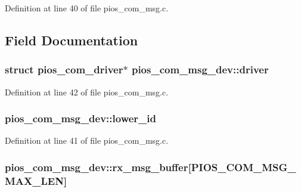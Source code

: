 Definition at line 40 of file pios\-\_\-com\-\_\-msg.\-c.



\subsection{Field Documentation}
\hypertarget{structpios__com__msg__dev_a776368775bf0a23a210d33ce79a0f620}{
\subsubsection[{driver}]{\setlength{\rightskip}{0pt plus 5cm}struct {\bf pios\-\_\-com\-\_\-driver}$\ast$ pios\-\_\-com\-\_\-msg\-\_\-dev\-::driver}}\label{structpios__com__msg__dev_a776368775bf0a23a210d33ce79a0f620}


Definition at line 42 of file pios\-\_\-com\-\_\-msg.\-c.

\hypertarget{structpios__com__msg__dev_a08cc90d0b7c8cd94cd589c948234869b}{
\subsubsection[{lower\-\_\-id}]{ pios\-\_\-com\-\_\-msg\-\_\-dev\-::lower\-\_\-id}}\label{structpios__com__msg__dev_a08cc90d0b7c8cd94cd589c948234869b}


Definition at line 41 of file pios\-\_\-com\-\_\-msg.\-c.

\hypertarget{structpios__com__msg__dev_ab1901ce323a85aa3e31dc1b965b0ce01}{
\subsubsection[{rx\-\_\-msg\-\_\-buffer}]{ pios\-\_\-com\-\_\-msg\-\_\-dev\-::rx\-\_\-msg\-\_\-buffer\mbox{[}P\-I\-O\-S\-\_\-\-C\-O\-M\-\_\-\-M\-S\-G\-\_\-\-M\-A\-X\-\_\-\-L\-E\-N\mbox{]}}}\label{structpios__com__msg__dev_ab1901ce323a85aa3e31dc1b965b0ce01}


